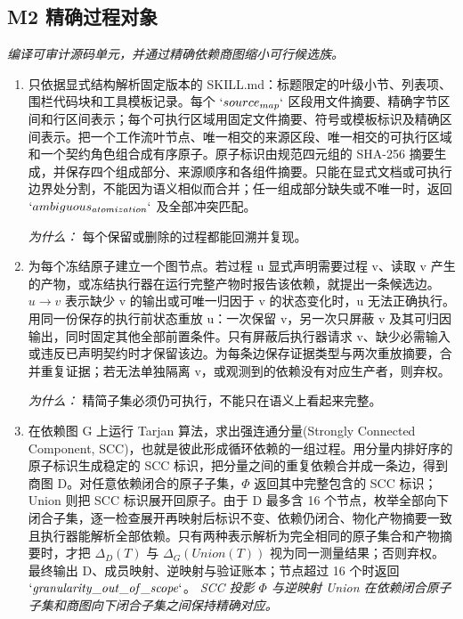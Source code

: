 \documentclass[10pt,a4paper]{article}
\begin{document}
\subsection*{M2 精确过程对象}
\emph{编译可审计源码单元，并通过精确依赖商图缩小可行候选族。}
\begin{enumerate}[leftmargin=*,start=4]
  \item 只依据显式结构解析固定版本的 SKILL.md：标题限定的叶级小节、列表项、围栏代码块和工具模板记录。每个 \(`source_{map}`\) 区段用文件摘要、精确字节区间和行区间表示；每个可执行区域用固定文件摘要、符号或模板标识及精确区间表示。把一个工作流叶节点、唯一相交的来源区段、唯一相交的可执行区域和一个契约角色组合成有序原子。原子标识由规范四元组的 SHA-256 摘要生成，并保存四个组成部分、来源顺序和各组件摘要。只能在显式文档或可执行边界处分割，不能因为语义相似而合并；任一组成部分缺失或不唯一时，返回 \(`ambiguous_{atomization}`\) 及全部冲突匹配。
\par\emph{为什么：} 每个保留或删除的过程都能回溯并复现。
  \item 为每个冻结原子建立一个图节点。若过程 u 显式声明需要过程 v、读取 v 产生的产物，或冻结执行器在运行完整产物时报告该依赖，就提出一条候选边。\(u\to v\) 表示缺少 v 的输出或可唯一归因于 v 的状态变化时，u 无法正确执行。用同一份保存的执行前状态重放 u：一次保留 v，另一次只屏蔽 v 及其可归因输出，同时固定其他全部前置条件。只有屏蔽后执行器请求 v、缺少必需输入或违反已声明契约时才保留该边。为每条边保存证据类型与两次重放摘要，合并重复证据；若无法单独隔离 v，或观测到的依赖没有对应生产者，则弃权。
\par\emph{为什么：} 精简子集必须仍可执行，不能只在语义上看起来完整。
  \item 在依赖图 G 上运行 Tarjan 算法，求出强连通分量(Strongly Connected Component, SCC)，也就是彼此形成循环依赖的一组过程。用分量内排好序的原子标识生成稳定的 SCC 标识，把分量之间的重复依赖合并成一条边，得到商图 D。对任意依赖闭合的原子子集，\(\Phi \) 返回其中完整包含的 SCC 标识；Union 则把 SCC 标识展开回原子。由于 D 最多含 16 个节点，枚举全部向下闭合子集，逐一检查展开再映射后标识不变、依赖仍闭合、物化产物摘要一致且执行器能解析全部依赖。只有两种表示解析为完全相同的原子集合和产物摘要时，才把 \(\Delta _{D}(T)\) 与 \(\Delta _{G}(Union(T))\) 视为同一测量结果；否则弃权。最终输出 D、成员映射、逆映射与验证账本；节点超过 16 个时返回 \(`\mathit{granularity\_out\_of\_scope}`\)。
\noindent\emph{SCC 投影 \(\Phi \) 与逆映射 Union 在依赖闭合原子子集和商图向下闭合子集之间保持精确对应。}
\par{}

\end{enumerate}
\end{document}
